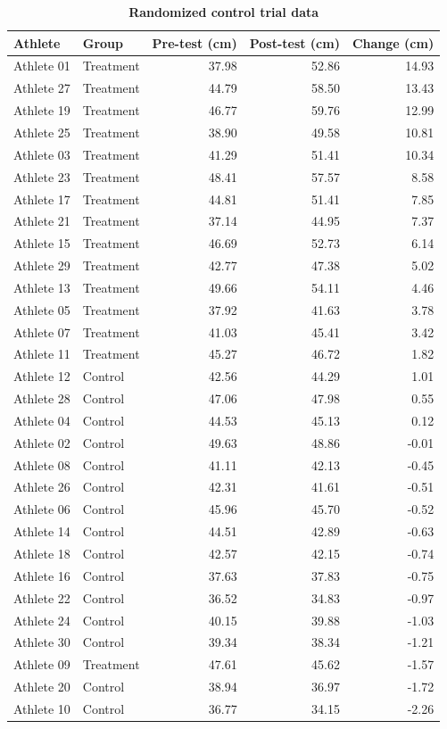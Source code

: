 \documentclass[
]{book}
\begin{document}
\begin{table}

\caption{\label{tab:rct-vj-data}\textbf{Randomized control trial data}}
\centering
\begin{tabular}[t]{llrrr}
\toprule
Athlete & Group & Pre-test (cm) & Post-test (cm) & Change (cm)\\
\midrule
Athlete 01 & Treatment & 37.98 & 52.86 & 14.93\\
Athlete 27 & Treatment & 44.79 & 58.50 & 13.43\\
Athlete 19 & Treatment & 46.77 & 59.76 & 12.99\\
Athlete 25 & Treatment & 38.90 & 49.58 & 10.81\\
Athlete 03 & Treatment & 41.29 & 51.41 & 10.34\\
\addlinespace
Athlete 23 & Treatment & 48.41 & 57.57 & 8.58\\
Athlete 17 & Treatment & 44.81 & 51.41 & 7.85\\
Athlete 21 & Treatment & 37.14 & 44.95 & 7.37\\
Athlete 15 & Treatment & 46.69 & 52.73 & 6.14\\
Athlete 29 & Treatment & 42.77 & 47.38 & 5.02\\
\addlinespace
Athlete 13 & Treatment & 49.66 & 54.11 & 4.46\\
Athlete 05 & Treatment & 37.92 & 41.63 & 3.78\\
Athlete 07 & Treatment & 41.03 & 45.41 & 3.42\\
Athlete 11 & Treatment & 45.27 & 46.72 & 1.82\\
Athlete 12 & Control & 42.56 & 44.29 & 1.01\\
\addlinespace
Athlete 28 & Control & 47.06 & 47.98 & 0.55\\
Athlete 04 & Control & 44.53 & 45.13 & 0.12\\
Athlete 02 & Control & 49.63 & 48.86 & -0.01\\
Athlete 08 & Control & 41.11 & 42.13 & -0.45\\
Athlete 26 & Control & 42.31 & 41.61 & -0.51\\
\addlinespace
Athlete 06 & Control & 45.96 & 45.70 & -0.52\\
Athlete 14 & Control & 44.51 & 42.89 & -0.63\\
Athlete 18 & Control & 42.57 & 42.15 & -0.74\\
Athlete 16 & Control & 37.63 & 37.83 & -0.75\\
Athlete 22 & Control & 36.52 & 34.83 & -0.97\\
\addlinespace
Athlete 24 & Control & 40.15 & 39.88 & -1.03\\
Athlete 30 & Control & 39.34 & 38.34 & -1.21\\
Athlete 09 & Treatment & 47.61 & 45.62 & -1.57\\
Athlete 20 & Control & 38.94 & 36.97 & -1.72\\
Athlete 10 & Control & 36.77 & 34.15 & -2.26\\
\bottomrule
\end{tabular}
\end{table}
\end{document}

